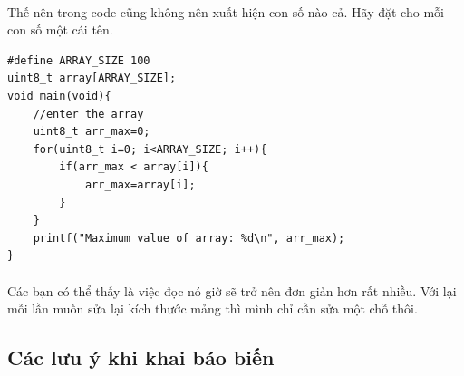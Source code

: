 \documentclass[12pt,a5paper]{book}
\begin{document}
\paragraph{}
Thế nên trong code cũng không nên xuất hiện con số nào cả. Hãy đặt cho mỗi con số một cái tên.

\begin{lstlisting}
#define ARRAY_SIZE 100
uint8_t array[ARRAY_SIZE];
void main(void){
	//enter the array
	uint8_t arr_max=0;
	for(uint8_t i=0; i<ARRAY_SIZE; i++){
		if(arr_max < array[i]){
			arr_max=array[i];
		}
	}
	printf("Maximum value of array: %d\n", arr_max);
}

\end{lstlisting}
\paragraph{}
Các bạn có thể thấy là việc đọc nó giờ sẽ trở nên đơn giản hơn rất nhiều. Với lại mỗi lần muốn sửa lại kích thước mảng thì mình chỉ cần sửa một chỗ thôi.
\subsection{Các lưu ý khi khai báo biến}
\end{document}
